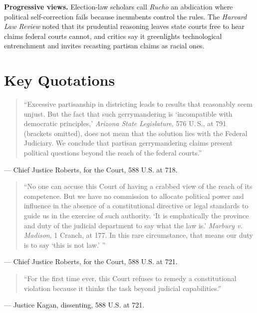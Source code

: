 \documentclass[12pt]{article}
\begin{document}
\textbf{Progressive views.} Election-law scholars call \textit{Rucho} an abdication where political self-correction fails because incumbents control the rules. The \textit{Harvard Law Review} noted that its prudential reasoning leaves state courts free to hear claims federal courts cannot, and critics say it greenlights technological entrenchment and invites recasting partisan claims as racial ones.

\section{Key Quotations}

\begin{quote}
``Excessive partisanship in districting leads to results that reasonably seem unjust. But the fact that such gerrymandering is `incompatible with democratic principles,' \textit{Arizona State Legislature}, 576 U.\,S., at 791 (brackets omitted), does not mean that the solution lies with the Federal Judiciary. We conclude that partisan gerrymandering claims present political questions beyond the reach of the federal courts.''
\end{quote}
\noindent --- Chief Justice Roberts, for the Court, 588 U.S. at 718.

\begin{quote}
``No one can accuse this Court of having a crabbed view of the reach of its competence. But we have no commission to allocate political power and influence in the absence of a constitutional directive or legal standards to guide us in the exercise of such authority. `It is emphatically the province and duty of the judicial department to say what the law is.' \textit{Marbury v. Madison}, 1 Cranch, at 177. In this rare circumstance, that means our duty is to say `this is not law.' ''
\end{quote}
\noindent --- Chief Justice Roberts, for the Court, 588 U.S. at 721.

\begin{quote}
``For the first time ever, this Court refuses to remedy a constitutional violation because it thinks the task beyond judicial capabilities.''
\end{quote}
\noindent --- Justice Kagan, dissenting, 588 U.S. at 721.
\end{document}
